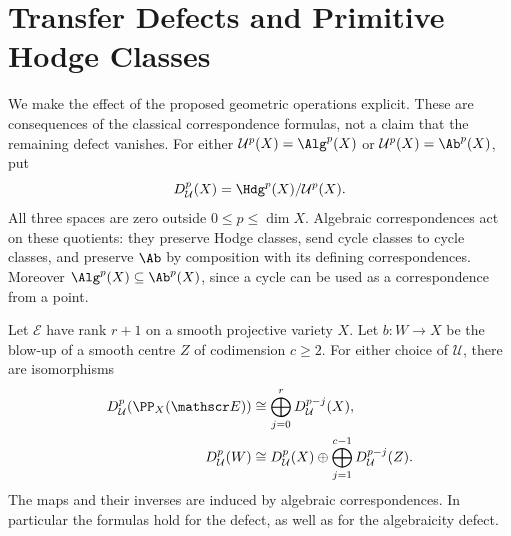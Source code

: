 \section{Transfer Defects and Primitive Hodge Classes}
\label{v7:ssec:exact-transfer-defects}

We make the effect of the proposed geometric operations explicit.
These are consequences of the classical correspondence formulas,
not a claim that the remaining defect vanishes. For either
\(\mathcal U^p(X)=\Alg^p(X)\) or
\(\mathcal U^p(X)=\Ab^p(X)\), put
\[
 D_{\mathcal U}^p(X)=\Hdg^p(X)/\mathcal U^p(X).
\]
All three spaces are zero outside \(0\le p\le\dim X\).
Algebraic correspondences act on these quotients: they preserve
Hodge classes, send cycle classes to cycle classes, and preserve
\(\Ab\) by composition with its defining correspondences.
Moreover \(\Alg^p(X)\subseteq\Ab^p(X)\), since a cycle can be
used as a correspondence from a point.

\begin{proposition}
\label{v7:prop:exact-defect-decomposition}
Let \(\mathscr E\) have rank \(r+1\) on a smooth projective
variety \(X\). Let \(b:W\to X\) be the blow-up of a smooth
centre \(Z\) of codimension \(c\ge2\). For either choice of
\(\mathcal U\), there are isomorphisms
\begin{align*}
 D_{\mathcal U}^p(\PP_X(\mathscr E))
   &\cong\bigoplus_{j=0}^{r}D_{\mathcal U}^{p-j}(X),\\
 D_{\mathcal U}^p(W)
   &\cong D_{\mathcal U}^p(X)
          \oplus\bigoplus_{j=1}^{c-1}
                     D_{\mathcal U}^{p-j}(Z).
\end{align*}
The maps and their inverses are induced by algebraic
correspondences. In particular the formulas hold for the
\Fiii{} defect, as well as for the algebraicity defect.
\end{proposition}

